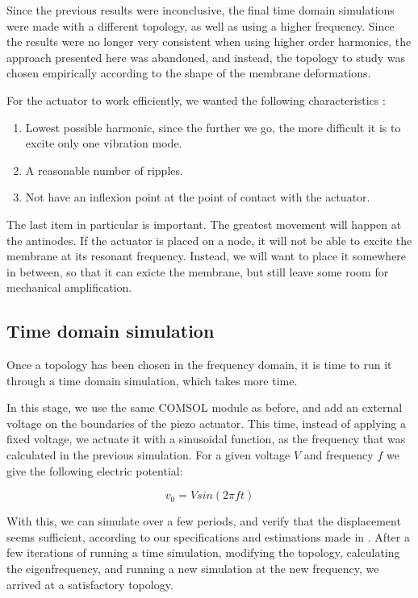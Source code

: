 
Since the previous results were inconclusive, the final time domain simulations
were made with a different topology, as well as using a higher frequency. Since
the results were no longer very consistent when using higher order harmonics,
the approach presented here was abandoned, and instead, the topology to study
was chosen empirically according to the shape of the membrane deformations.

For the actuator to work efficiently, we wanted the following characteristics :
\begin{enumerate}
  \item Lowest possible harmonic, since the further we go, the more difficult it
    is to excite only one vibration mode.
  \item A reasonable number of ripples.
  \item Not have an inflexion point at the point of contact with the actuator.
\end{enumerate}

The last item in particular is important. The greatest movement will happen at
the antinodes. If the actuator is placed on a node, it will not be able to
excite the membrane at its resonant frequency. Instead, we will want to place it
somewhere in between, so that it can exicte the membrane, but still leave some
room for mechanical amplification.

\subsection{Time domain simulation}
\label{sub:time-domain}

Once a topology has been chosen in the frequency domain, it is time to run it
through a time domain simulation, which takes more time.

In this stage, we use the same COMSOL module as before, and add an external
voltage on the boundaries of the piezo actuator. This time, instead of applying
a fixed voltage, we actuate it with a sinusoidal function, as the frequency that
was calculated in the previous simulation. For a given voltage $V$ and frequency
$f$ we give the following electric potential:

\begin{equation}
  v_0 = V sin(2\pi f t)
  \label{eq:v0}
\end{equation}

With this, we can simulate over a few periods, and verify that the displacement
seems sufficient, according to our specifications and estimations made in
. After a few iterations of running a time simulation,
modifying the topology, calculating the eigenfrequency, and running a new
simulation at the new frequency, we arrived at a satisfactory topology.

